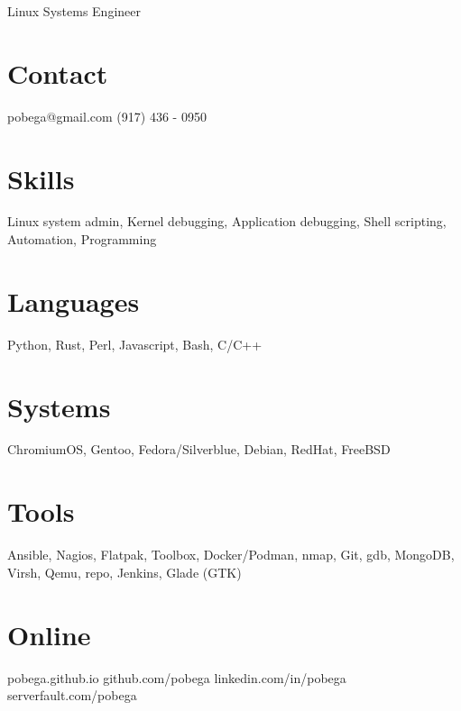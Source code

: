 \documentclass[]{resume}
\begin{document}
\graphicspath{ {images/} }

       {Linux Systems Engineer}


\begin{aside}
  \section{Contact}
    pobega@gmail.com
    (917) 436 - 0950
  \section{Skills}
    Linux system admin, 
    Kernel debugging,
    Application debugging,
    Shell scripting, Automation, Programming
  \section{Languages}
    Python, Rust, Perl,
    Javascript, Bash, C/C++
  \section{Systems}
    ChromiumOS, Gentoo, Fedora/Silverblue, Debian, RedHat, FreeBSD
  \section{Tools}
	Ansible, Nagios, Flatpak, Toolbox, Docker/Podman, nmap, Git, gdb, MongoDB, Virsh, Qemu, repo, Jenkins, Glade (GTK)
  \section{Online}
    {\bodyfontbold pobega}.github.io
    github.com/{\bodyfontbold pobega}
    linkedin.com/in/{\bodyfontbold pobega}
    serverfault.com/{\bodyfontbold pobega}
\end{aside}
\end{document}
